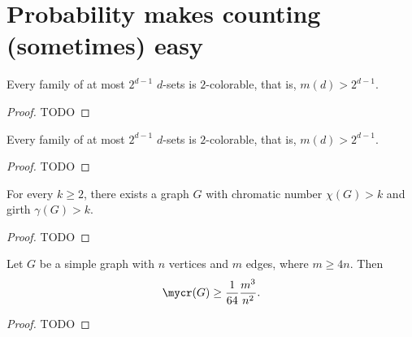 \chapter{Probability makes counting (sometimes) easy}


\begin{theorem}
  \label{ch45theorem1}
  Every family of at most $2^{d-1}$ $d$-sets is $2$-colorable, that is,
  $m(d) > 2^{d-1}$.
\end{theorem}
\begin{proof}
  TODO
\end{proof}


\begin{theorem}
  \label{ch45theorem2}
  Every family of at most $2^{d-1}$ $d$-sets is $2$-colorable, that is,
$m(d) > 2^{d-1}$.
\end{theorem}
\begin{proof}
  TODO
\end{proof}

\begin{theorem}
  \label{ch45theorem3}
For every $k \geq 2$, there exists a graph $G$ with chromatic number $\chi(G) > k$ and
girth $\gamma(G) > k$.
\end{theorem}
\begin{proof}
  TODO
\end{proof}

\begin{theorem}
  \label{ch45theorem4}
  Let $G$ be a simple graph with $n$ vertices and $m$ edges, where $m \ge 4n$. Then
  \[
  \mycr(G) \ge \frac{1}{64}\frac{m^3}{n^2}.
  \]
\end{theorem}
\begin{proof}
  TODO
\end{proof}


%

